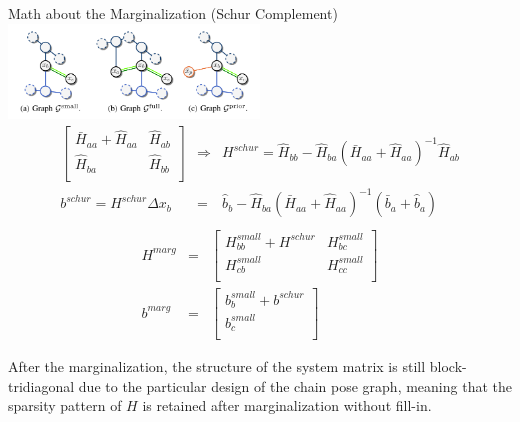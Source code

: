 \documentclass[10pt]{beamer}
\begin{document}
	\begin{frame}{Math about the Marginalization (Schur Complement)}
		\centering
		\includegraphics[width=0.5\textwidth]{./img/schur.png}\\
		\begin{equation}
		\begin{array}{rcl}
		\left[\begin{array}{cc}
		\bar{H}_{aa} + \hat{H}_{aa} & \hat{H}_{ab} \\
		\hat{H}_{ba} & \hat{H}_{bb} \\
		\end{array}\right] & \Rightarrow & H^{schur}=\hat{H}_{bb}-\hat{H}_{ba}(\bar{H}_{aa}+\hat{H}_{aa})^{-1}\hat{H}_{ab} \\
		b^{schur}=H^{schur}\Delta x_b & = & \hat{b}_b - \hat{H}_{ba}(\bar{H}_{aa}+\hat{H}_{aa})^{-1}(\bar{b}_a+\hat{b}_a) \\
		\end{array}
		\end{equation}
		\begin{equation}
		\begin{array}{rcl}
		H^{marg} & = & \left[\begin{array}{cc}
		H_{bb}^{small} + H^{schur} & H_{bc}^{small} \\
		H_{cb}^{small} & H_{cc}^{small} \\
		\end{array}\right] \\
		b^{marg} & = & \left[\begin{array}{c}
		b_b^{small} + b^{schur} \\
		b_c^{small} \\
		\end{array}\right]
		\end{array}
		\end{equation}
		\begin{block}{}
			\small
			After the marginalization, the structure of the system matrix is still block-tridiagonal due to the particular design of the chain pose graph, meaning that the sparsity pattern of $H$ is retained after marginalization without fill-in.
		\end{block}		
	\end{frame}
\end{document}

